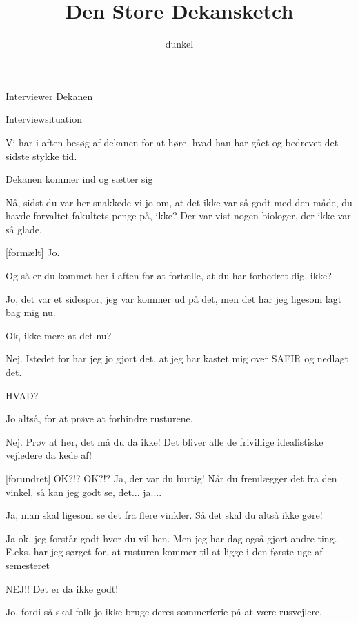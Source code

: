 \documentclass[danish]{article}
\title{Den Store Dekansketch}
\author{dunkel}
\begin{document}
\maketitle

\begin{roles}
   Interviewer
   Dekanen
\end{roles}

\begin{sketch}

\scene Interviewsituation

 Vi har i aften besøg af dekanen for at høre, hvad han har gået og
bedrevet det sidste stykke tid.

\scene Dekanen kommer ind og sætter sig

 Nå, sidst du var her snakkede vi jo om, at det ikke var så godt med
den måde, du havde forvaltet fakultets penge på, ikke? Der var vist
nogen biologer, der ikke var så glade.

[formælt] Jo.

 Og så er du kommet her i aften for at fortælle, at du har forbedret
dig, ikke?

 Jo, det var et sidespor, jeg var kommer ud på det, men det har jeg
ligesom lagt bag mig nu.

 Ok, ikke mere at det nu?

 Nej. Istedet for har jeg jo gjort det, at jeg har kastet mig over
SAFIR og nedlagt det.

 HVAD?

 Jo altså, for at prøve at forhindre rusturene.

 Nej. Prøv at hør, det må du da ikke! Det bliver alle de frivillige
idealistiske vejledere da kede af!

[forundret] OK?!? OK?!? Ja, der var du hurtig! Når du fremlægger
det fra den vinkel, så kan jeg godt se, det... ja....

 Ja, man skal ligesom se det fra flere vinkler.  Så det skal du altså ikke gøre!

 Ja ok, jeg forstår godt hvor du vil hen. Men jeg har dag også gjort
andre ting. F.eks. har jeg sørget for, at rusturen kommer til at ligge
i den første uge af semesteret

 NEJ!! Det er da ikke godt!

 Jo, fordi så skal folk jo ikke bruge deres sommerferie på at være
rusvejlere.


\end{sketch}
\end{document}
